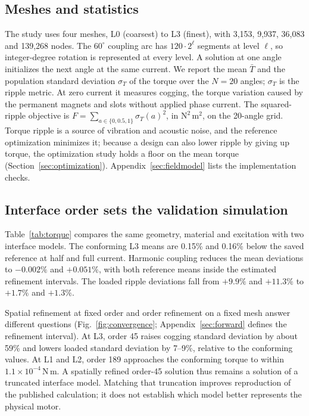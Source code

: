 \documentclass{anvil-paper}
\begin{document}
\subsection{Meshes and statistics}\label{sec:meshes}
The study uses four meshes, L0 (coarsest) to L3 (finest), with 3,153,
9,937, 36,083 and 139,268 nodes. The $60^\circ$ coupling arc has $120\cdot2^\ell$ segments at level
$\ell$, so integer-degree rotation is represented at every level.
A solution at one angle initializes the next angle at the same current.
We report the mean $\bar T$ and the population standard deviation
$\sigma_T$ of the torque over the $N=20$ angles; $\sigma_T$ is the ripple
metric. At zero current it measures
cogging, the torque variation caused by the permanent magnets and slots
without applied phase current. The squared-ripple objective is
$F=\sum_{a\in\{0,0.5,1\}}\sigma_T(a)^2$, in $\mathrm{N^2\,m^2}$, on the
20-angle grid. Torque ripple is a source of vibration and acoustic noise,
and the reference optimization minimizes it; because a design can also
lower ripple by giving up torque, the optimization study holds a floor on
the mean torque
(Section~\ref{sec:optimization}). Appendix~\ref{sec:fieldmodel} lists the
implementation checks.

\subsection{Interface order sets the validation simulation}\label{sec:coupling-results}
Table~\ref{tab:torque} compares the same geometry, material and excitation
with two interface models. The conforming L3 means are 0.15\% and 0.16\%
below the saved reference at half and full current. Harmonic coupling reduces the mean deviations
to $-0.002\%$ and $+0.051\%$, with both reference means inside the estimated
refinement intervals. The loaded ripple deviations fall from $+9.9\%$
and $+11.3\%$ to $+1.7\%$ and $+1.3\%$.

\begin{table}[htbp]\centering\small
\caption{L3 population standard deviation and mean torque, in N\,m per
sector, on the 20-angle grid. The last column gives ripple deviation from the
saved reference; n/a identifies the reference itself. The reference is
subsequently refined in Section~\ref{sec:refinement}.}
\label{tab:torque}

\end{table}

Spatial refinement at fixed order and order refinement on a fixed mesh
answer different questions (Fig.~\ref{fig:convergence}; Appendix~\ref{sec:forward} defines the refinement interval). At L3, order 45
raises cogging standard deviation by about 59\% and lowers loaded
standard deviation by 7--9\%, relative to the conforming values. At L1 and L2,
order 189 approaches the conforming torque to within $1.1\times10^{-4}$\,N\,m.
A spatially refined order-45 solution thus remains a solution of a
truncated interface model. Matching that truncation improves reproduction
of the published calculation; it does not establish which model better
represents the physical motor.
\end{document}
